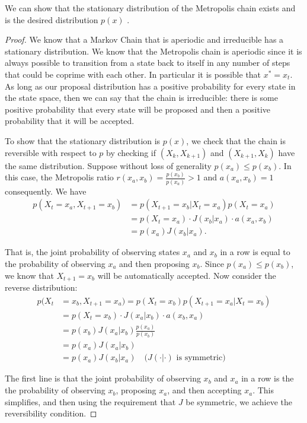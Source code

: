 \documentclass[11pt]{amsart}
\theoremstyle{theorem} %
\theoremstyle{definition}                  %
\theoremstyle{example}                       %
\theoremstyle{remark}                       %
\numberwithin{equation}{section}
\begin{document}
We can show that the stationary distribution of the Metropolis chain exists and is the desired distribution $p(x)$ \cite[p.~279]{gelman}. 
\begin{proof}
    We know that a Markov Chain that is aperiodic and irreducible has a stationary distribution. We know that the Metropolis chain is aperiodic since it is always possible to transition from a state back to itself in any number of steps that could be coprime with each other. In particular it is possible that $x^*=x_t$. As long as our proposal distribution has a positive probability for every state in the state space, then we can say that the chain is irreducible: there is some positive probability that every state will be proposed and then a positive probability that it will be accepted.
    
    To show that the stationary distribution is $p(x)$, we check that the chain is reversible with respect to $p$ by checking if $(X_k, X_{k+1})$ and $(X_{k+1}, X_k)$ have the same distribution. Suppose without loss of generality $p(x_a)\leq p(x_b)$. In this case, the Metropolis ratio $r(x_a, x_b)=\frac{p(x_b)}{p(x_a)}>1$ and $a(x_a,x_b)=1$ consequently. We have 
    \begin{align*}
        p(X_{t} =x_a , X_{t+1} =x_b )&= p(X_{t+1}=x_b|X_t=x_a)p(X_t=x_a)\\
        &=p(X_t=x_a)\cdot J(x_b|x_a) \cdot a(x_a,x_b)\\
        &=p(x_a)J(x_b |x_a ).
    \end{align*}
    
    That is, the joint probability of observing states $x_a$ and $x_b$ in a row is equal to the probability of observing $x_a$ and then proposing $x_b$. Since $p(x_a)\leq p(x_b)$, we know that $X_{t+1}=x_b$ will be automatically accepted. Now consider the reverse distribution:
    \begin{align*}
        p(X_{t} &=x_b , X_{t+1} =x_a ) = p(X_t=x_b)p(X_{t+1}=x_a|X_t=x_b) \\
        &=p(X_t=x_b)\cdot J(x_a|x_b)\cdot a(x_b,x_a)\\
        &=p(x_b)J(x_a |x_b )\frac{p(x_a)}{p(x_b)} \\
        &=p(x_a)J(x_a |x_b )\\
        &=p(x_a)J(x_b |x_a ) \quad \text{($J(\cdot|\cdot)$ is symmetric)}
    \end{align*}
    
    The first line is that the joint probability of observing $x_b$ and $x_a$ in a row is the the probability of observing $x_b$, proposing $x_a$, and then accepting $x_a$. This simplifies, and then using the requirement that $J$ be symmetric, we achieve the reversibility condition.
    
\end{proof}
\end{document}
